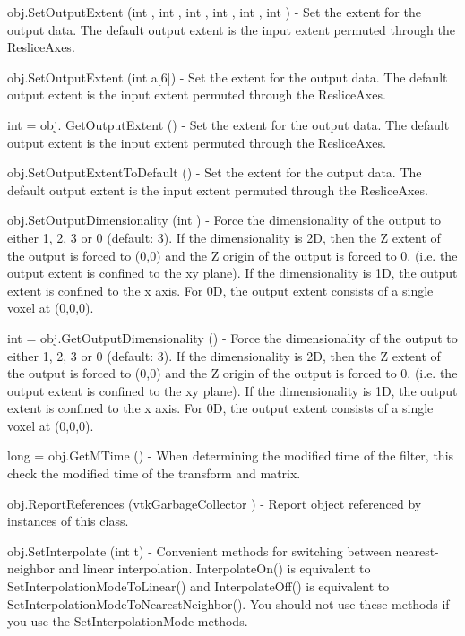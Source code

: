 \begin{DoxyItemize}
\item {\ttfamily obj.\-Set\-Output\-Extent (int , int , int , int , int , int )} -\/ Set the extent for the output data. The default output extent is the input extent permuted through the Reslice\-Axes.  
\item {\ttfamily obj.\-Set\-Output\-Extent (int a\mbox{[}6\mbox{]})} -\/ Set the extent for the output data. The default output extent is the input extent permuted through the Reslice\-Axes.  
\item {\ttfamily int = obj. Get\-Output\-Extent ()} -\/ Set the extent for the output data. The default output extent is the input extent permuted through the Reslice\-Axes.  
\item {\ttfamily obj.\-Set\-Output\-Extent\-To\-Default ()} -\/ Set the extent for the output data. The default output extent is the input extent permuted through the Reslice\-Axes.  
\item {\ttfamily obj.\-Set\-Output\-Dimensionality (int )} -\/ Force the dimensionality of the output to either 1, 2, 3 or 0 (default\-: 3). If the dimensionality is 2\-D, then the Z extent of the output is forced to (0,0) and the Z origin of the output is forced to 0. (i.\-e. the output extent is confined to the xy plane). If the dimensionality is 1\-D, the output extent is confined to the x axis. For 0\-D, the output extent consists of a single voxel at (0,0,0).  
\item {\ttfamily int = obj.\-Get\-Output\-Dimensionality ()} -\/ Force the dimensionality of the output to either 1, 2, 3 or 0 (default\-: 3). If the dimensionality is 2\-D, then the Z extent of the output is forced to (0,0) and the Z origin of the output is forced to 0. (i.\-e. the output extent is confined to the xy plane). If the dimensionality is 1\-D, the output extent is confined to the x axis. For 0\-D, the output extent consists of a single voxel at (0,0,0).  
\item {\ttfamily long = obj.\-Get\-M\-Time ()} -\/ When determining the modified time of the filter, this check the modified time of the transform and matrix.  
\item {\ttfamily obj.\-Report\-References (vtk\-Garbage\-Collector )} -\/ Report object referenced by instances of this class.  
\item {\ttfamily obj.\-Set\-Interpolate (int t)} -\/ Convenient methods for switching between nearest-\/neighbor and linear interpolation. Interpolate\-On() is equivalent to Set\-Interpolation\-Mode\-To\-Linear() and Interpolate\-Off() is equivalent to Set\-Interpolation\-Mode\-To\-Nearest\-Neighbor(). You should not use these methods if you use the Set\-Interpolation\-Mode methods.  

\end{DoxyItemize}
